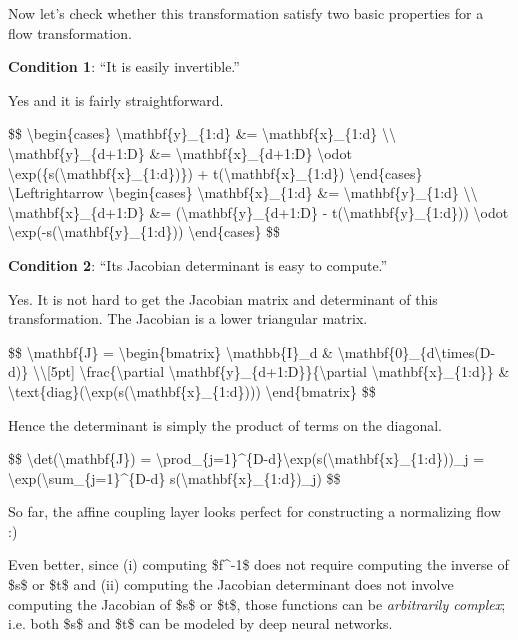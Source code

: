 Now let's check whether this transformation satisfy two basic properties for a flow transformation.

\textbf{Condition 1}: ``It is easily invertible.''

Yes and it is fairly straightforward.

\$\$ \textbackslash begin\{cases\} \textbackslash mathbf\{y\}\_\{1:d\} \&= \textbackslash mathbf\{x\}\_\{1:d\} \textbackslash\textbackslash{} \textbackslash mathbf\{y\}\_\{d+1:D\} \&= \textbackslash mathbf\{x\}\_\{d+1:D\} \textbackslash odot \textbackslash exp(\{s(\textbackslash mathbf\{x\}\_\{1:d\})\}) + t(\textbackslash mathbf\{x\}\_\{1:d\}) \textbackslash end\{cases\} \textbackslash Leftrightarrow \textbackslash begin\{cases\} \textbackslash mathbf\{x\}\_\{1:d\} \&= \textbackslash mathbf\{y\}\_\{1:d\} \textbackslash\textbackslash{} \textbackslash mathbf\{x\}\_\{d+1:D\} \&= (\textbackslash mathbf\{y\}\_\{d+1:D\} - t(\textbackslash mathbf\{y\}\_\{1:d\})) \textbackslash odot \textbackslash exp(-s(\textbackslash mathbf\{y\}\_\{1:d\})) \textbackslash end\{cases\} \$\$

\textbf{Condition 2}: ``Its Jacobian determinant is easy to compute.''

Yes. It is not hard to get the Jacobian matrix and determinant of this transformation. The Jacobian is a lower triangular matrix.

\$\$ \textbackslash mathbf\{J\} = \textbackslash begin\{bmatrix\} \textbackslash mathbb\{I\}\_d \& \textbackslash mathbf\{0\}\_\{d\textbackslash times(D-d)\} \textbackslash\textbackslash{[}5pt{]} \textbackslash frac\{\textbackslash partial \textbackslash mathbf\{y\}\_\{d+1:D\}\}\{\textbackslash partial \textbackslash mathbf\{x\}\_\{1:d\}\} \& \textbackslash text\{diag\}(\textbackslash exp(s(\textbackslash mathbf\{x\}\_\{1:d\}))) \textbackslash end\{bmatrix\} \$\$

Hence the determinant is simply the product of terms on the diagonal.

\$\$ \textbackslash det(\textbackslash mathbf\{J\}) = \textbackslash prod\_\{j=1\}\^{}\{D-d\}\textbackslash exp(s(\textbackslash mathbf\{x\}\_\{1:d\}))\_j = \textbackslash exp(\textbackslash sum\_\{j=1\}\^{}\{D-d\} s(\textbackslash mathbf\{x\}\_\{1:d\})\_j) \$\$

So far, the affine coupling layer looks perfect for constructing a normalizing flow :)

Even better, since (i) computing \$f\^{}-1\$ does not require computing the inverse of \$s\$ or \$t\$ and (ii) computing the Jacobian determinant does not involve computing the Jacobian of \$s\$ or \$t\$, those functions can be \emph{arbitrarily complex}; i.e. both \$s\$ and \$t\$ can be modeled by deep neural networks.

